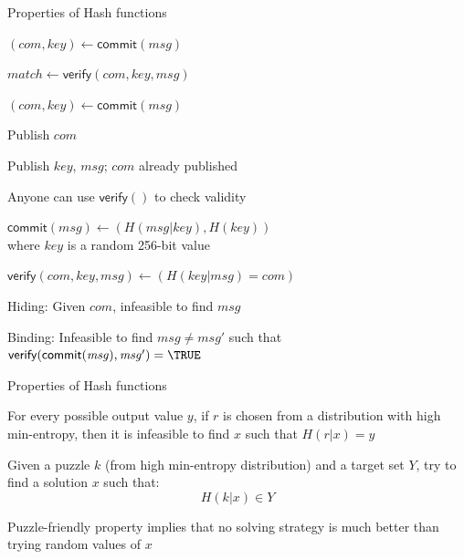 \begin{frame}{Properties of Hash functions}


\BI
\item $(\mathit{com}, \mathit{key}) \gets \textsf{commit}(\mathit{msg})$
\item $\mathit{match} \gets \textsf{verify}(\mathit{com}, \mathit{key}, \mathit{msg})$
\EI

\begin{overprint}
\BI
\item $(\mathit{com}, \mathit{key}) \gets \textsf{commit}(\mathit{msg})$
\item Publish $\mathit{com}$
\EI

\BI
\item Publish $\mathit{key}$, $\mathit{msg}$; $\mathit{com}$ already published
\item Anyone can use $\textsf{verify}()$ to check validity
\EI

\BI
\item $\textsf{commit}(\mathit{msg}) \gets (H(\mathit{msg} | \mathit{key}), H(\mathit{key}))$\\
where $\mathit{key}$ is a random 256-bit value
\item $\textsf{verify}(\mathit{com}, \mathit{key}, \mathit{msg}) \gets ( H(\mathit{key} | \mathit{msg}) = \mathit{com} )$
\EI

\BI
	\item \alert{Hiding}:  Given $\mathit{com}$, infeasible to find $\mathit{msg}$
	\item \alert{Binding}: Infeasible to find $\mathit{msg} \neq \mathit{msg}'$ such that
		$\textsf{verify}(\textsf{commit}(\mathit{msg}), \mathit{msg}') = \TRUE$
\EI


\end{overprint}


\end{frame}





\begin{frame}{Properties of Hash functions}


\BI
\item For every possible output value $y$, 
if $r$ is chosen from a distribution with high min-entropy,
then it is infeasible to find $x$ such that $H(r | x) = y$
\EI


\BI
\item Given a puzzle $k$ (from high min-entropy distribution)  
and a target set $Y$, try to find a solution $x$ such that:
\[
  H(k | x) \in Y
\]
\item Puzzle-friendly property implies that no solving strategy is much better than trying random values of $x$
\EI

\end{frame}

